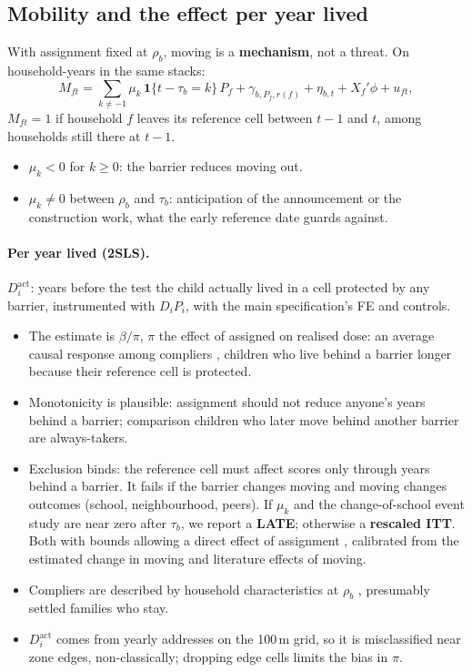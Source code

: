 \documentclass[11pt]{article}
\begin{document}
\subsection{Mobility and the effect per year lived}\label{sec:mobility}

With assignment fixed at \(\rho_b\), moving is a \textbf{mechanism}, not a threat. On
household-years in the same stacks:
\[
M_{ft} = \sum_{k \neq -1} \mu_k\, \mathbf{1}\{t - \tau_b = k\}\, P_f + \gamma_{b,P_f,r(f)} + \eta_{b,t} + X_f'\phi + u_{ft},
\]
\(M_{ft} = 1\) if household \(f\) leaves its reference cell between \(t-1\) and \(t\), among
households still there at \(t-1\).
\begin{itemize}
\item \(\mu_k < 0\) for \(k \ge 0\): the barrier reduces moving out.
\item \(\mu_k \neq 0\) between \(\rho_b\) and \(\tau_b\): anticipation of the announcement or
  the construction work, what the early reference date guards against.
\end{itemize}

\paragraph{Per year lived (2SLS).} \(D_i^{\text{act}}\): years before the test the child
actually lived in a cell protected by any barrier, instrumented with \(D_i P_i\), with the main
specification's FE and controls.
\begin{itemize}
\item The estimate is \(\beta / \pi\), \(\pi\) the effect of assigned on realised dose: an
  average causal response among compliers \autocite{angristTwoStageLeastSquares1995}, children
  who live behind a barrier longer because their reference cell is protected.
\item Monotonicity is plausible: assignment should not reduce anyone's years behind a barrier;
  comparison children who later move behind another barrier are always-takers.
\item Exclusion binds: the reference cell must affect scores only through years behind a
  barrier. It fails if the barrier changes moving and moving changes outcomes (school,
  neighbourhood, peers). If \(\mu_k\) and the change-of-school event study are near zero after
  \(\tau_b\), we report a \textbf{LATE}; otherwise a \textbf{rescaled ITT}. Both with bounds
  allowing a direct effect of assignment \autocite{conleyPlausiblyExogenous2012}, calibrated
  from the estimated change in moving and literature effects of moving.
\item Compliers are described by household characteristics at \(\rho_b\)
  \autocite{abadieSemiparametricInstrumentalVariable2003}, presumably settled families who stay.
\item \(D_i^{\text{act}}\) comes from yearly addresses on the 100\,m grid, so it is misclassified
  near zone edges, non-classically; dropping edge cells limits the bias in \(\pi\).
\end{itemize}
\end{document}

